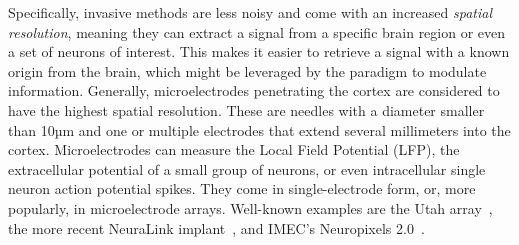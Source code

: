 
Specifically, invasive methods are less noisy and come with an increased \emph{spatial
resolution}, meaning they can extract a signal from a specific brain region or even a
set of neurons of interest.
This makes it easier to retrieve a signal with a known origin from the brain, which
might be leveraged by the paradigm to modulate information.
Generally, microelectrodes penetrating the cortex are considered to have the highest
spatial resolution.
These are needles with a diameter smaller than 10µm and one or multiple electrodes that
extend several millimeters into the cortex.
Microelectrodes can measure the Local Field Potential (LFP), the extracellular potential
of a small group of neurons, or even intracellular single neuron action potential
spikes.
They come in single-electrode form, or, more popularly, in microelectrode arrays.
Well-known examples are the Utah array~\cite{Maynard1997}, the more recent NeuraLink
implant~\cite{Musk2019}, and IMEC's Neuropixels 2.0~\cite{Steinmetz2021}.

